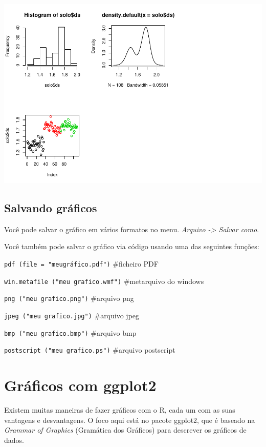 \documentclass[
]{book}
\begin{document}
\includegraphics{TudodoR_files/figure-latex/unnamed-chunk-181-2.pdf}

\hypertarget{salvando-gruxe1ficos}{%
\section{Salvando gráficos}\label{salvando-gruxe1ficos}}

Você pode salvar o gráfico em vários formatos no menu.
\emph{Arquivo -\textgreater{} Salvar como}.

Você também pode salvar o gráfico via código usando uma das seguintes funções:

\texttt{pdf\ (file\ =\ "meugráfico.pdf")} \#ficheiro PDF

\texttt{win.metafile\ ("meu\ grafico.wmf")} \#metarquivo do windows

\texttt{png\ ("meu\ grafico.png")} \#arquivo png

\texttt{jpeg\ ("meu\ grafico.jpg")} \#arquivo jpeg

\texttt{bmp\ ("meu\ grafico.bmp")} \#arquivo bmp

\texttt{postscript\ ("meu\ grafico.ps")} \#arquivo postscript

\hypertarget{gruxe1ficos-com-ggplot2}{%
\chapter{Gráficos com ggplot2}\label{gruxe1ficos-com-ggplot2}}

Existem muitas maneiras de fazer gráficos com o R, cada um com as suas vantagens e desvantagens. O foco aqui está no pacote ggplot2, que é baseado na \emph{Grammar of Graphics} (Gramática dos Gráficos) para descrever os gráficos de dados.
\end{document}
